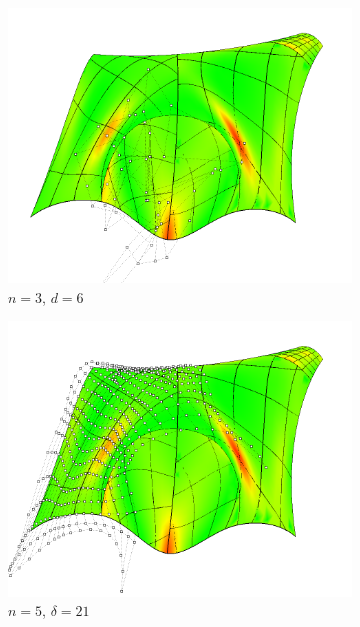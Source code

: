 \documentclass[9pt,academicons]{article}
\begin{document}
\begin{figure}[!ht]
  \begin{subfigure}{.33\textwidth}
    \centering
    \includegraphics[width=\textwidth]{images/pocket/cg3.png}
    \caption{$n=3$, $d=6$}
    \label{fig:pocket-3-cg}
  \end{subfigure}
  \begin{subfigure}{.33\textwidth}
    \centering
    \includegraphics[width=\textwidth]{images/pocket/cg2.png}
    \caption{$n=5$, $\delta=21$}
    \label{fig:pocket-5-cg}
  \end{subfigure}
  \begin{subfigure}{.33\textwidth}
    \centering

\end{subfigure}
\end{figure}
\end{document}
